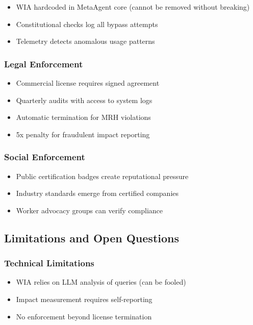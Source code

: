 \documentclass[11pt]{article}
\begin{document}
\begin{itemize}
    \item WIA hardcoded in MetaAgent core (cannot be removed without breaking)
    \item Constitutional checks log all bypass attempts
    \item Telemetry detects anomalous usage patterns
\end{itemize}

\subsubsection{Legal Enforcement}

\begin{itemize}
    \item Commercial license requires signed agreement
    \item Quarterly audits with access to system logs
    \item Automatic termination for MRH violations
    \item 5x penalty for fraudulent impact reporting
\end{itemize}

\subsubsection{Social Enforcement}

\begin{itemize}
    \item Public certification badges create reputational pressure
    \item Industry standards emerge from certified companies
    \item Worker advocacy groups can verify compliance
\end{itemize}

\subsection{Limitations and Open Questions}

\subsubsection{Technical Limitations}

\begin{itemize}
    \item WIA relies on LLM analysis of queries (can be fooled)
    \item Impact measurement requires self-reporting
    \item No enforcement beyond license termination
\end{itemize}
\end{document}
